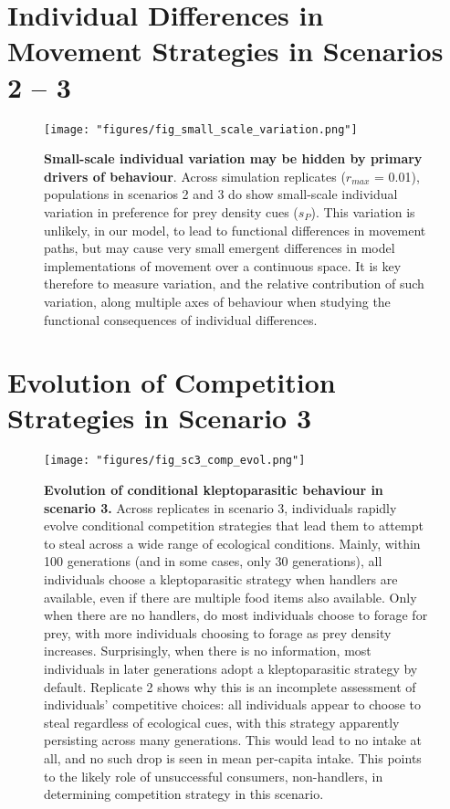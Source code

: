 \documentclass[]{article}
\begin{document}
\newpage

\hypertarget{individual-differences-in-movement-strategies-in-scenarios-2-3}{%
\section{Individual Differences in Movement Strategies in Scenarios 2 -- 3}\label{individual-differences-in-movement-strategies-in-scenarios-2-3}}

\begin{figure}
\centering
\texttt{[image: "figures/fig\_small\_scale\_variation.png"]}
\caption{\textbf{Small-scale individual variation may be hidden by primary drivers of behaviour}. Across simulation replicates (\(r_{max}\) = 0.01), populations in scenarios 2 and 3 do show small-scale individual variation in preference for prey density cues (\(s_P\)). This variation is unlikely, in our model, to lead to functional differences in movement paths, but may cause very small emergent differences in model implementations of movement over a continuous space. It is key therefore to measure variation, and the relative contribution of such variation, along multiple axes of behaviour when studying the functional consequences of individual differences.}
\end{figure}

\newpage

\hypertarget{evolution-of-competition-strategies-in-scenario-3}{%
\section{Evolution of Competition Strategies in Scenario 3}\label{evolution-of-competition-strategies-in-scenario-3}}

\begin{figure}
\centering
\texttt{[image: "figures/fig\_sc3\_comp\_evol.png"]}
\caption{\textbf{Evolution of conditional kleptoparasitic behaviour in scenario 3.} Across replicates in scenario 3, individuals rapidly evolve conditional competition strategies that lead them to attempt to steal across a wide range of ecological conditions. Mainly, within 100 generations (and in some cases, only 30 generations), all individuals choose a kleptoparasitic strategy when handlers are available, even if there are multiple food items also available. Only when there are no handlers, do most individuals choose to forage for prey, with more individuals choosing to forage as prey density increases. Surprisingly, when there is no information, most individuals in later generations adopt a kleptoparasitic strategy by default. Replicate 2 shows why this is an incomplete assessment of individuals' competitive choices: all individuals appear to choose to steal regardless of ecological cues, with this strategy apparently persisting across many generations. This would lead to no intake at all, and no such drop is seen in mean per-capita intake. This points to the likely role of unsuccessful consumers, non-handlers, in determining competition strategy in this scenario.}
\end{figure}
\end{document}
